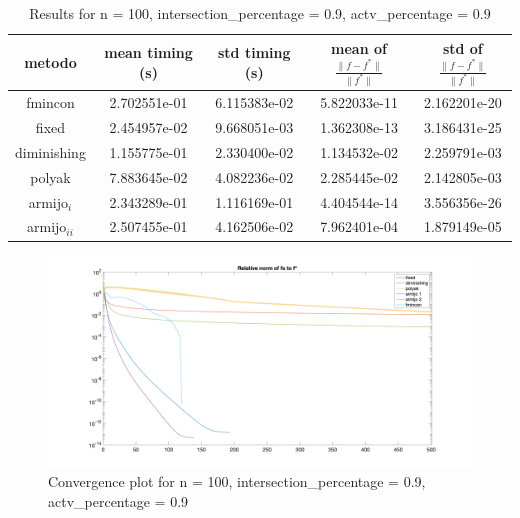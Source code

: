 
\begin{table}[H]
\setlength{\tabcolsep}{10pt} %
\renewcommand{\arraystretch}{1.2} %
\centering
\begin{tabular}{|ccccc|} 
\hline 
\multicolumn{1}{|c||}{metodo}   & \multicolumn{1}{c|}{mean timing (s)}    & \multicolumn{1}{c|}{std timing (s)} & \multicolumn{1}{c|}{mean of $\frac{\|f - f^*\|}{\|f^*\|}$}   & std of $\frac{\|f - f^*\|}{\|f^*\|}$ \\ \hline\hline 
\multicolumn{1}{|c||}{fmincon}       & \multicolumn{1}{c|}{2.702551e-01} & \multicolumn{1}{c|}{6.115383e-02}  & \multicolumn{1}{c|}{5.822033e-11} & 2.162201e-20  \\ \hline \hline
\multicolumn{1}{|c||}{fixed}       & \multicolumn{1}{c|}{2.454957e-02} & \multicolumn{1}{c|}{9.668051e-03}  & \multicolumn{1}{c|}{1.362308e-13} & 3.186431e-25  \\ \hline 
\multicolumn{1}{|c||}{diminishing}       & \multicolumn{1}{c|}{1.155775e-01} & \multicolumn{1}{c|}{2.330400e-02}  & \multicolumn{1}{c|}{1.134532e-02} & 2.259791e-03  \\ \hline 
\multicolumn{1}{|c||}{polyak}       & \multicolumn{1}{c|}{7.883645e-02} & \multicolumn{1}{c|}{4.082236e-02}  & \multicolumn{1}{c|}{2.285445e-02} & 2.142805e-03  \\ \hline 
\multicolumn{1}{|c||}{armijo$_{i}$}       & \multicolumn{1}{c|}{2.343289e-01} & \multicolumn{1}{c|}{1.116169e-01}  & \multicolumn{1}{c|}{4.404544e-14} & 3.556356e-26  \\ \hline 
\multicolumn{1}{|c||}{armijo$_{ii}$}       & \multicolumn{1}{c|}{2.507455e-01} & \multicolumn{1}{c|}{4.162506e-02}  & \multicolumn{1}{c|}{7.962401e-04} & 1.879149e-05  \\ \hline 
\end{tabular} 

\caption{Results for n = 100, intersection\_percentage = 0.9, actv\_percentage = 0.9}
\label{tab:100_zeronove_zeronove}
\end{table}


\begin{figure}[H]
\centering
    \includegraphics[width=20cm, center]{./plots/plot_100_zeronove_zeronove.png}
    \caption{Convergence plot for n = 100, intersection\_percentage = 0.9, actv\_percentage = 0.9}
    \label{fig:100_zeronove_zeronove}
\end{figure} 



